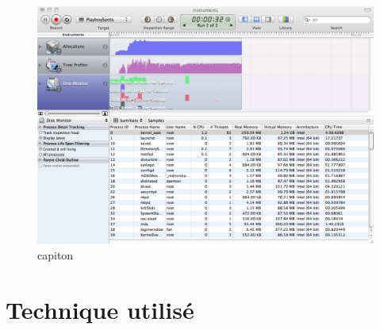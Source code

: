 \begin{figure}[htbp]
	\centering
		\includegraphics[width=6in]{Image/captureInstruments.png}
	\caption{capiton}
	\label{fig:Image_captureInstruments}
\end{figure}



\section{Technique utilisé} %
\label{sec:technique_utilisé}



